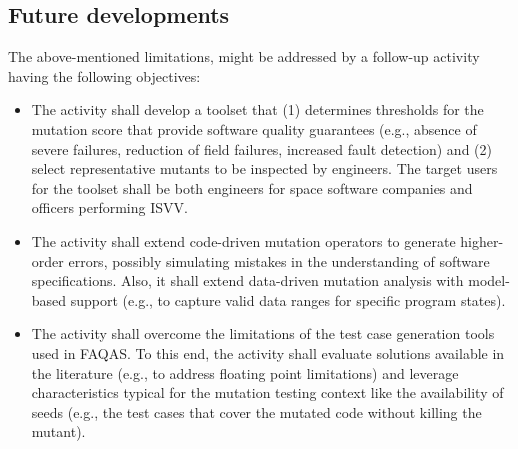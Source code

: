 %

\subsection{Future developments}

The above-mentioned limitations, might be addressed by a follow-up activity having the following objectives:

\begin{itemize}
\item {}
The activity shall develop a toolset that (1) determines thresholds for the mutation score that provide software quality guarantees (e.g., absence of severe failures, reduction of field failures, increased fault detection) and (2) select representative mutants to be inspected by engineers. The target users for the toolset shall be both engineers for space software companies and officers performing ISVV.

\item {} The activity shall extend code-driven mutation operators to generate higher-order errors, possibly simulating mistakes in the understanding of software specifications. Also, it shall extend data-driven mutation analysis with model-based support (e.g., to capture valid data ranges for specific program states).

\item {} The activity shall overcome the limitations of the test case generation tools used in FAQAS. To this end, the activity shall evaluate solutions available in the literature (e.g., to address floating point limitations) and leverage characteristics typical for the mutation testing context like the availability of seeds (e.g., the test cases that cover the mutated code without killing the mutant).

\end{itemize}

\ENDCHANGEDWPT
